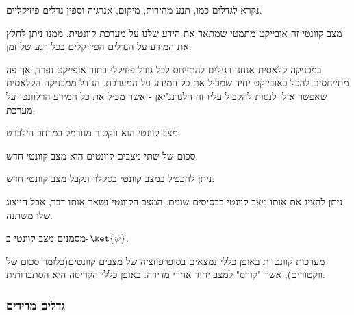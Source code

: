 \documentclass{tstextbook}
\begin{document}
\begin{definition}
נקרא לגדלים כמו, תנע מהירות, מיקום, אנרגיה וספין גדלים פיזיקליים.

\end{definition}
\begin{definition}
מצב קוונטי זה אובייקט מתמטי שמתאר את הידע שלנו על מערכת קוונטית. ממנו ניתן לחלץ את המידע על הגדלים הפיזיקלים בכל רגע של זמן.

\end{definition}
\begin{remark}
במכניקה קלאסית אנחנו רגילים להתייחס לכל גודל פיזיקלי בתור אופייקט נפרד, אך פה מתייחסים להכל כאובייקט יחיד שמכיל את כל המידע על המערכת. הגודל ממכניקה הקלאסית שאפשר אולי לנסות להקביל עליו זה הלגרנג'יאן - אשר מכיל את כל המידע הרלוונטי על מערכת.

\end{remark}
\begin{theorem}
מצב קוונטי הוא ווקטור מנורמל במרחב הילברט.

\end{theorem}
\begin{corollary}
סכום של שתי מצבים קוונטים הוא מצב קוונטי חדש.

\end{corollary}
\begin{corollary}
ניתן להכפיל במצב קוונטי בסקלר ונקבל מצב קוונטי חדש.

\end{corollary}
\begin{corollary}
ניתן להציג את אותו מצב קוונטי בבסיסים שונים. המצב הקוונטי נשאר אותו דבר, אבל הייצוג שלו משתנה.

\end{corollary}
\begin{symbolize}
מסמנים מצב קוונטי ב-\(\ket{\psi}\).

\end{symbolize}
מערכות קוונטיות באופן כללי נמצאים בסופרפוזציה של מצבים קוונטים(כלומר סכום של ווקטורים), אשר "קורס" למצב יחיד אחרי מדידה. באופן כללי הקריסה היא הסתברותית.

\subsubsection{גדלים מדידים}
\end{document}
